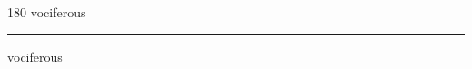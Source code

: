 
\begin{frame}
\begin{center}
\begin{turn}{180}
{\fontsize{2.5cm}{1em}\selectfont vociferous}
\end{turn}
\vspace{1em}\par  
\hrule
\vspace{1em}\par  
{\fontsize{2.5cm}{1em}\selectfont vociferous}
\end{center}
\end{frame}
